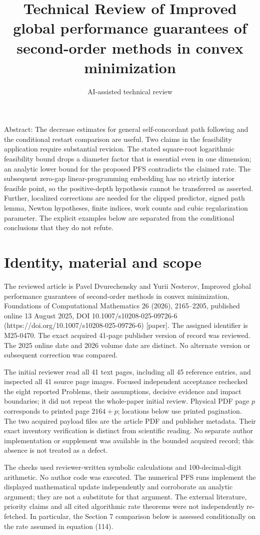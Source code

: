 \documentclass[10pt]{article}
\title{Technical Review of
Improved global performance guarantees of second-order methods in convex minimization}
\author{AI-assisted technical review}
\date{}
\begin{document}
\maketitle
Abstract: The decrease estimates for general self-concordant path following and the conditional restart comparison are useful. Two claims in the feasibility application require substantial revision. The stated square-root logarithmic feasibility bound drops a diameter factor that is essential even in one dimension; an analytic lower bound for the proposed PFS contradicts the claimed rate. The subsequent zero-gap linear-programming embedding has no strictly interior feasible point, so the positive-depth hypothesis cannot be transferred as asserted. Further, localized corrections are needed for the clipped predictor, signed path lemma, Newton hypotheses, finite indices, work counts and cubic regularization parameter. The explicit examples below are separated from the conditional conclusions that they do not refute.\par
\section*{Identity, material and scope}
The reviewed article is Pavel Dvurechensky and Yurii Nesterov, Improved global performance guarantees of second-order methods in convex minimization, Foundations of Computational Mathematics 26 (2026), 2165–2205, published online 13 August 2025, DOI 10.1007/s10208-025-09726-6 (https://doi.org/10.1007/s10208-025-09726-6) [paper]. The assigned identifier is M25-0470. The exact acquired 41-page publisher version of record was reviewed. The 2025 online date and 2026 volume date are distinct. No alternate version or subsequent correction was compared.\par
The initial reviewer read all 41 text pages, including all 45 reference entries, and inspected all 41 source page images. Focused independent acceptance rechecked the eight reported Problems, their assumptions, decisive evidence and impact boundaries; it did not repeat the whole-paper initial review. Physical PDF page \(p\) corresponds to printed page \(2164+p\); locations below use printed pagination. The two acquired payload files are the article PDF and publisher metadata. Their exact inventory verification is distinct from scientific reading. No separate author implementation or supplement was available in the bounded acquired record; this absence is not treated as a defect.\par
The checks used reviewer-written symbolic calculations and 100-decimal-digit arithmetic. No author code was executed. The numerical PFS runs implement the displayed mathematical update independently and corroborate an analytic argument; they are not a substitute for that argument. The external literature, priority claims and all cited algorithmic rate theorems were not independently re-fetched. In particular, the Section 7 comparison below is assessed conditionally on the rate assumed in equation (114).\par
\end{document}
